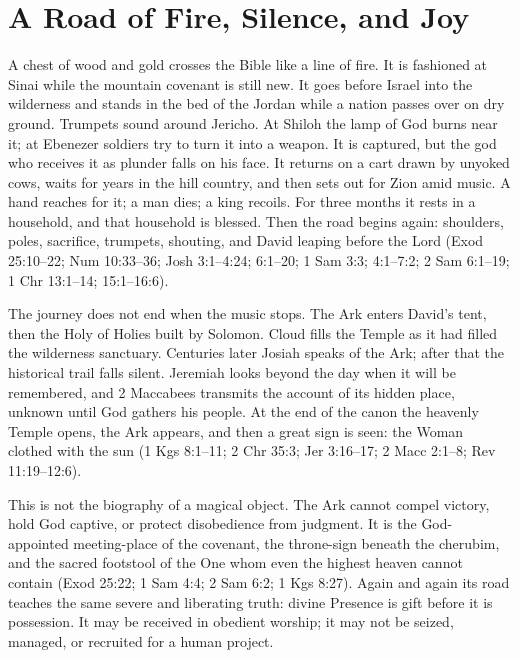 \section{A Road of Fire, Silence, and Joy}

A chest of wood and gold crosses the Bible like a line of fire.  It is fashioned
at Sinai while the mountain covenant is still new.  It goes before Israel into
the wilderness and stands in the bed of the Jordan while a nation passes over
on dry ground.  Trumpets sound around Jericho.  At Shiloh the lamp of God burns
near it; at Ebenezer soldiers try to turn it into a weapon.  It is captured,
but the god who receives it as plunder falls on his face.  It returns on a cart
drawn by unyoked cows, waits for years in the hill country, and then sets out
for Zion amid music.  A hand reaches for it; a man dies; a king recoils.  For
three months it rests in a household, and that household is blessed.  Then the
road begins again: shoulders, poles, sacrifice, trumpets, shouting, and David
leaping before the Lord (Exod 25:10--22; Num 10:33--36; Josh 3:1--4:24;
6:1--20; 1 Sam 3:3; 4:1--7:2; 2 Sam 6:1--19; 1 Chr 13:1--14;
15:1--16:6).

The journey does not end when the music stops.  The Ark enters David's tent,
then the Holy of Holies built by Solomon.  Cloud fills the Temple as it had
filled the wilderness sanctuary.  Centuries later Josiah speaks of the Ark;
after that the historical trail falls silent.  Jeremiah looks beyond the day
when it will be remembered, and 2 Maccabees transmits the account of its hidden
place, unknown until God gathers his people.  At the end of the canon the
heavenly Temple opens, the Ark appears, and then a great sign is seen: the
Woman clothed with the sun (1 Kgs 8:1--11; 2 Chr 35:3; Jer 3:16--17;
2 Macc 2:1--8; Rev 11:19--12:6).

This is not the biography of a magical object.  The Ark cannot compel victory,
hold God captive, or protect disobedience from judgment.  It is the
God-appointed meeting-place of the covenant, the throne-sign beneath the
cherubim, and the sacred footstool of the One whom even the highest heaven
cannot contain (Exod 25:22; 1 Sam 4:4; 2 Sam 6:2; 1 Kgs 8:27).  Again and
again its road teaches the same severe and liberating truth: divine Presence is
gift before it is possession.  It may be received in obedient worship; it may
not be seized, managed, or recruited for a human project.


